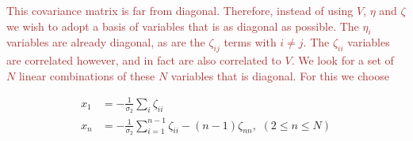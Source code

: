 \documentclass[12pt]{article}
\newcommand{\SH}[1]{\textcolor{brown}{[{\bf SH}: #1]}}
\newcommand{\sh}[1]{\textcolor{brown}{#1}}
\begin{document}


%
\sh{This covariance matrix is far from diagonal. Therefore, instead of using $V$, $\eta$ and $\zeta$ we wish to adopt a basis of variables that is as diagonal as possible. The $\eta_i$ variables are already diagonal, as are the $\zeta_{ij}$ terms with $i\neq j$. The $\zeta_{ii}$ variables are correlated however, and in fact are also correlated to $V$. We look for a set of $N$ linear combinations of these $N$ variables that is diagonal. For this we choose}

%
\begin{align}
\label{BasisTransform}
x_1 &= -\frac{1}{\sigma_2}\sum_i\zeta_{ii} \nonumber \\
x_n &= -\frac{1}{\sigma_2}\sum_{i=1}^{n-1}\zeta_{ii}-(n-1)\zeta_{nn},\,\, (2\leq n \leq N)
\end{align}
%
\end{document}
